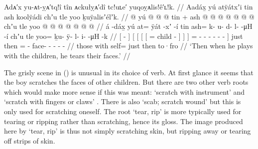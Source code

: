 \ex\label{ex:106-24-tear-kids}%
%
\begingl
	\glpreamble	Adᴀ′x yu-ᴀt-ỵᴀ′tq!î tîn ᴀckułỵᴀ′dî tc!uʟe′ yuqoỵᴀlis!ê′ʟ!k. //
	\glpreamble	Aadáx̱ yú atÿátxʼi tin ash koolÿádi chʼu tle yoo ḵuÿalisʼélʼk. //
	\gla	{}  @ {} {}
			{} {} {} yú {}  @ {} @ {} @ {} {} {} tin {} +
				ash @  @ {} @ {} @ {} @ {} @ {} @ {} {}
			chʼu tle yoo @  @ {} @ {} @ {} @ {} @ {} @ {} //
	\glb	{} á -dáx̱ {} 
			{} {} {} yú {} at= ÿát -xʼ -í {} {} tin {}
				ash= k- u- d- l-  -μH -í {}
			chʼu tle yoo= ḵu- ÿ- l- i-  -μH -k //
	\glc	{}[  - {}]
			{}[ {}[ {}[ 
								{}[ = child -  {}] {}]  {}]
				= - - - -  - - {}]
			just then = - face- - -  - - //
	\gld	{}  {} {}
			{} {} {} those {}  {} {} {} {} {} with {}
				self=  {} {} {} {} {} {} {}
			just then to·fro  {} {} {} {} {} {} //
	\glft	‘Then when he plays with the children, he tears their faces.’
		//
\endgl
\xe

The grisly scene in (\lastx) is unusual in its choice of verb.
At first glance it seems that the boy scratches the faces of other children.
But there are two other verb roots which would make more sense if this was meant:  ‘scratch with instrument’ \parencites[f04/64–65]{leer:1973}[754–756]{leer:1976} and  ‘scratch with fingers or claws’ \parencites[08/86]{leer:1973}[457]{leer:1976}.
There is also  ‘scab; scratch wound’ \parencites[f03/39–43]{leer:1973}[616]{leer:1976} but this is only used for scratching oneself.
The root  ‘tear, rip’ \parencites[09/217–220]{leer:1973}[518–519]{leer:1976} is more typically used for tearing or ripping rather than scratching, hence its gloss.
The image produced here by  ‘tear, rip’ is thus not simply scratching skin, but ripping away or tearing off strips of skin.

